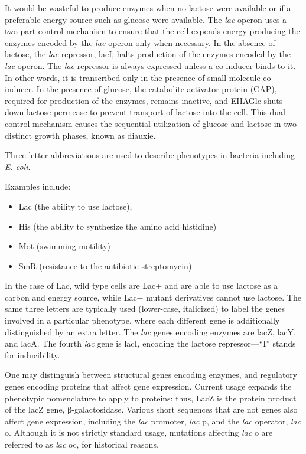 It would be wasteful to produce enzymes when no lactose were available or if a preferable energy source such as glucose were available. The \emph{lac} operon uses a two-part control mechanism to ensure that the cell expends energy producing the enzymes encoded by the \emph{lac} operon only when necessary. In the absence of lactose, the \emph{lac} repressor, lacI, halts production of the enzymes encoded by the \emph{lac} operon. The \emph{lac} repressor is always expressed unless a co-inducer binds to it. In other words, it is transcribed only in the presence of small molecule co-inducer. In the presence of glucose, the catabolite activator protein (CAP), required for production of the enzymes, remains inactive, and EIIAGlc shuts down lactose permease to prevent transport of lactose into the cell. This dual control mechanism causes the sequential utilization of glucose and lactose in two distinct growth phases, known as diauxie.

Three-letter abbreviations are used to describe phenotypes in bacteria including \emph{E. coli}.

Examples include:

\begin{itemize}
\tightlist
\item
  Lac (the ability to use lactose),
\item
  His (the ability to synthesize the amino acid histidine)
\item
  Mot (swimming motility)
\item
  SmR (resistance to the antibiotic streptomycin)
\end{itemize}

In the case of Lac, wild type cells are Lac+ and are able to use lactose as a carbon and energy source, while Lac− mutant derivatives cannot use lactose. The same three letters are typically used (lower-case, italicized) to label the genes involved in a particular phenotype, where each different gene is additionally distinguished by an extra letter. The \emph{lac} genes encoding enzymes are lacZ, lacY, and lacA. The fourth \emph{lac} gene is lacI, encoding the lactose repressor---``I'' stands for inducibility.

One may distinguish between structural genes encoding enzymes, and regulatory genes encoding proteins that affect gene expression. Current usage expands the phenotypic nomenclature to apply to proteins: thus, LacZ is the protein product of the lacZ gene, β-galactosidase. Various short sequences that are not genes also affect gene expression, including the \emph{lac} promoter, \emph{lac} p, and the \emph{lac} operator, \emph{lac} o. Although it is not strictly standard usage, mutations affecting \emph{lac} o are referred to as \emph{lac} oc, for historical reasons.

